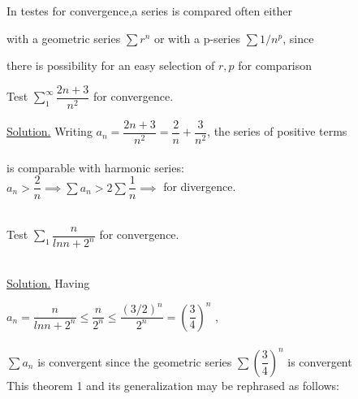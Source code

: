 \documentclass[11pt]{amsbook}
\begin{document}
  \hspace*{20pt}  In testes for convergence,a series is compared often either
  
  with a geometric series $\sum r^n$ or with a p-series $\sum 1/n^p$, since
  
  there is possibility for an easy selection of $r,p$ for comparison\\
  \begin{exmp}
   Test $\displaystyle\sum_{1}^{\infty}\dfrac{2n+3}{n^2}$ for convergence.\\
  
  \end{exmp}
  

  
  \underline{Solution.} Writing $a_n = \dfrac{2n+3}{n^2}=
  \dfrac{2}{n} + \dfrac{3}{n^2}$, the series of positive terms\\\\ \hspace*{15pt} is comparable with harmonic series:\\
  
  \hspace*{70pt}  $ a_n > \dfrac{2}{n} \implies \sum a_n > 2\sum \dfrac{1}{n} \implies $ for divergence.\\\\
  
  
  \begin{exmp}
   Test $\displaystyle\sum_{1}{}\dfrac{n}{lnn+2^n}$ for convergence.\\\\
  
  \end{exmp}
  
 
  
  \underline{Solution.} Having
  
  \hspace*{70pt}$a_n =\dfrac{n}{lnn+2^n} \leq \dfrac{n}{2^n} \leq \dfrac{(3/2)^n}{2^n} = (\dfrac{3}{4})^n      $ ,\\\\
  
  $\sum a_n$ is convergent since the geometric series 
  $\sum(\dfrac{3}{4})^n$ is convergent\\
  
   This theorem 1 and its generalization may be rephrased as follows:\\
  
  
  
  
  
\end{document}
